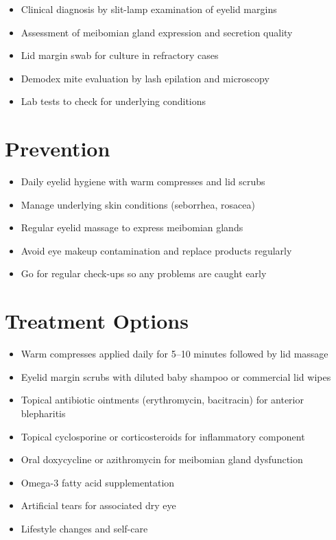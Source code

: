 \begin{itemize}[noitemsep]
  \item Clinical diagnosis by slit-lamp examination of eyelid margins
  \item Assessment of meibomian gland expression and secretion quality
  \item Lid margin swab for culture in refractory cases
  \item Demodex mite evaluation by lash epilation and microscopy
  \item Lab tests to check for underlying conditions
\end{itemize}

\section{Prevention}

\begin{itemize}[noitemsep]
  \item Daily eyelid hygiene with warm compresses and lid scrubs
  \item Manage underlying skin conditions (seborrhea, rosacea)
  \item Regular eyelid massage to express meibomian glands
  \item Avoid eye makeup contamination and replace products regularly
  \item Go for regular check-ups so any problems are caught early
\end{itemize}

\section{Treatment Options}

\begin{itemize}[noitemsep]
  \item Warm compresses applied daily for 5--10 minutes followed by lid massage
  \item Eyelid margin scrubs with diluted baby shampoo or commercial lid wipes
  \item Topical antibiotic ointments (erythromycin, bacitracin) for anterior blepharitis
  \item Topical cyclosporine or corticosteroids for inflammatory component
  \item Oral doxycycline or azithromycin for meibomian gland dysfunction
  \item Omega-3 fatty acid supplementation
  \item Artificial tears for associated dry eye
  \item Lifestyle changes and self-care
\end{itemize}

